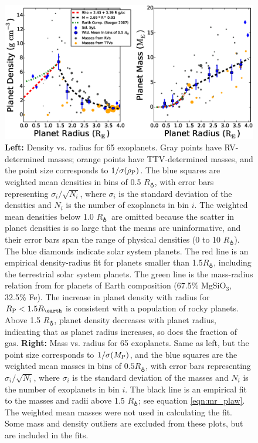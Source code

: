 \documentclass[iop]{emulateapj}
\newcommand{\rpl}{\ensuremath{R_{\rm P}}}
\newcommand{\mpl}{\ensuremath{M_{\rm P}}}
\newcommand{\rhopl}{\ensuremath{\rho_{\rm P}}}
\newcommand{\rearth}{\ensuremath{R_\earth}}
\begin{document}
\begin{figure}[htbp] %
   \centering
    \includegraphics[width=7in]{mr_small.eps} 
   \caption{\small \textbf{Left:} Density vs. radius for 65 exoplanets.  Gray points  have RV-determined masses; orange points have TTV-determined masses, and the point size corresponds to $1/\sigma(\rhopl)$.  The blue squares are weighted mean densities in bins of 0.5 \rearth, with error bars representing $\sigma_i/\sqrt{N_i}$, where $\sigma_i$ is the standard deviation of the densities and $N_i$ is the number of exoplanets in bin $i$.  The weighted mean densities below 1.0 \rearth\ are omitted because the scatter in planet densities is so large that the means are uninformative, and their error bars span the range of physical densities (0 to 10 \rearth).  The blue diamonds indicate solar system planets.  The red line is an empirical density-radius fit for planets smaller than 1.5\rearth, including the terrestrial solar system planets.  The green line is the mass-radius relation from \citet{Seager2007} for planets of Earth composition (67.5\% MgSiO$_3$, 32.5\% Fe).  The increase in planet density with radius for $\rpl < 1.5 \rearth$ is consistent with a population of rocky planets.  Above 1.5 \rearth, planet density decreases with planet radius, indicating that as planet radius increases, so does the fraction of gas.  \textbf{Right:} Mass vs. radius for 65 exoplanets.  Same as left, but the point size corresponds to $1/\sigma(\mpl)$, and the blue squares are the weighted mean masses in bins of $0.5 \rearth$, with error bars representing $\sigma_i/\sqrt{N_i}$, where $\sigma_i$ is the standard deviation of the masses and $N_i$ is the number of exoplanets in bin $i$. The black line is an empirical fit to the masses and radii above 1.5 \rearth; see equation \ref{eqn:mr_plaw}.  The weighted mean masses were not used in calculating the fit.   Some mass and density outliers are excluded from these plots, but are included in the fits. }
   \label{fig:rm_4}
\end{figure}
\end{document}
